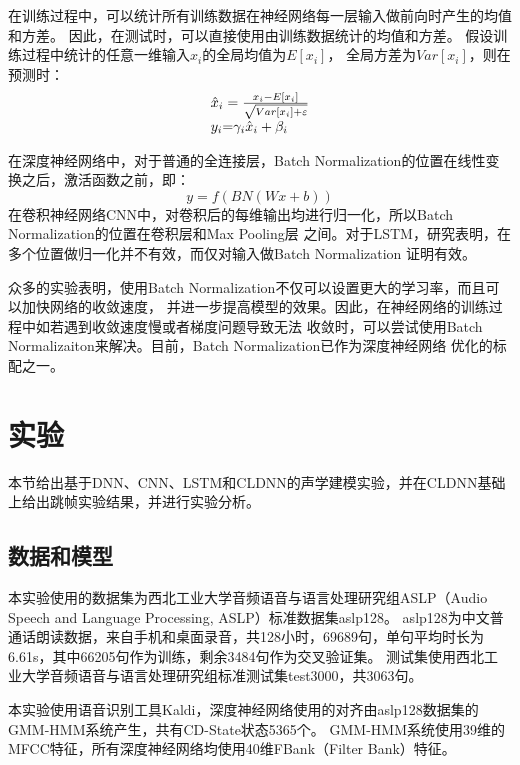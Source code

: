 在训练过程中，可以统计所有训练数据在神经网络每一层输入做前向时产生的均值和方差。
因此，在测试时，可以直接使用由训练数据统计的均值和方差。
假设训练过程中统计的任意一维输入$x_i$的全局均值为$E\left[ {{x_i}} \right]$，
全局方差为$Var[{x_i}]$，则在预测时：
\begin{equation}
\begin{array}{l}
{{\hat x}_i} = \frac{{{x_i} - E\left[ {{x_i}} \right]}}{{\sqrt {Var[{x_i}] + \varepsilon } }}\\
{y_i}{\rm{ = }}{\gamma _i}{{\hat x}_i} + {\beta _i}
\end{array}
\end{equation}

在深度神经网络中，对于普通的全连接层，Batch Normalization的位置在线性变换之后，激活函数之前，即：
\begin{equation}
y = f(BN(Wx + b))
\end{equation}
在卷积神经网络CNN中，对卷积后的每维输出均进行归一化，所以Batch Normalization的位置在卷积层和Max Pooling层
之间。对于LSTM，研究表明，在多个位置做归一化并不有效，而仅对输入做Batch Normalization
证明有效。

众多的实验表明，使用Batch Normalization不仅可以设置更大的学习率，而且可以加快网络的收敛速度，
并进一步提高模型的效果。因此，在神经网络的训练过程中如若遇到收敛速度慢或者梯度问题导致无法
收敛时，可以尝试使用Batch Normalizaiton来解决。目前，Batch Normalization已作为深度神经网络
优化的标配之一。

\section{实验}

本节给出基于DNN、CNN、LSTM和CLDNN的声学建模实验，并在CLDNN基础上给出跳帧实验结果，并进行实验分析。

\subsection{数据和模型}

本实验使用的数据集为西北工业大学音频语音与语言处理研究组ASLP（Audio Speech and Language Processing, ASLP）标准数据集aslp128。
aslp128为中文普通话朗读数据，来自手机和桌面录音，共128小时，69689句，单句平均时长为6.61s，其中66205句作为训练，剩余3484句作为交叉验证集。
测试集使用西北工业大学音频语音与语言处理研究组标准测试集test3000，共3063句。

本实验使用语音识别工具Kaldi，深度神经网络使用的对齐由aslp128数据集的GMM-HMM系统产生，共有CD-State状态5365个。
GMM-HMM系统使用39维的MFCC特征，所有深度神经网络均使用40维FBank（Filter Bank）特征。


